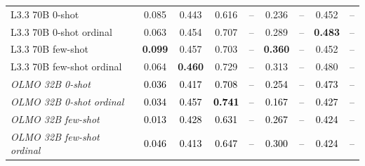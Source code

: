 \begin{table}[htbp]
\begin{ChSevenFloatBody}
{\begin{tabular}{lcccccccc}
L3.3 70B 0-shot & 0.085 & 0.443 & 0.616 & -- & 0.236 & -- & 0.452 & -- \\
L3.3 70B 0-shot ordinal & 0.063 & 0.454 & 0.707 & -- & 0.289 & -- & \textbf{0.483} & -- \\
L3.3 70B few-shot & \textbf{0.099} & 0.457 & 0.703 & -- & \textbf{0.360} & -- & 0.452 & -- \\
L3.3 70B few-shot ordinal & 0.064 & \textbf{0.460} & 0.729 & -- & 0.313 & -- & 0.480 & -- \\
\textit{OLMO 32B 0-shot} & \textcolor{black}{0.036} & \textcolor{black}{0.417} & \textcolor{black}{0.708} & \textcolor{black}{--} & \textcolor{black}{0.254} & \textcolor{black}{--} & \textcolor{black}{0.473} & \textcolor{black}{--} \\
\textit{OLMO 32B 0-shot ordinal} & \textcolor{black}{0.034} & \textcolor{black}{0.457} & \textcolor{black}{\textbf{0.741}} & \textcolor{black}{--} & \textcolor{black}{0.167} & \textcolor{black}{--} & \textcolor{black}{0.427} & \textcolor{black}{--} \\
\textit{OLMO 32B few-shot} & \textcolor{black}{0.013} & \textcolor{black}{0.428} & \textcolor{black}{0.631} & \textcolor{black}{--} & \textcolor{black}{0.267} & \textcolor{black}{--} & \textcolor{black}{0.424} & \textcolor{black}{--} \\
\textit{OLMO 32B few-shot ordinal} & \textcolor{black}{0.046} & \textcolor{black}{0.413} & \textcolor{black}{0.647} & \textcolor{black}{--} & \textcolor{black}{0.300} & \textcolor{black}{--} & \textcolor{black}{0.424} & \textcolor{black}{--} \\


\end{tabular}}
\end{ChSevenFloatBody}
\end{table}

